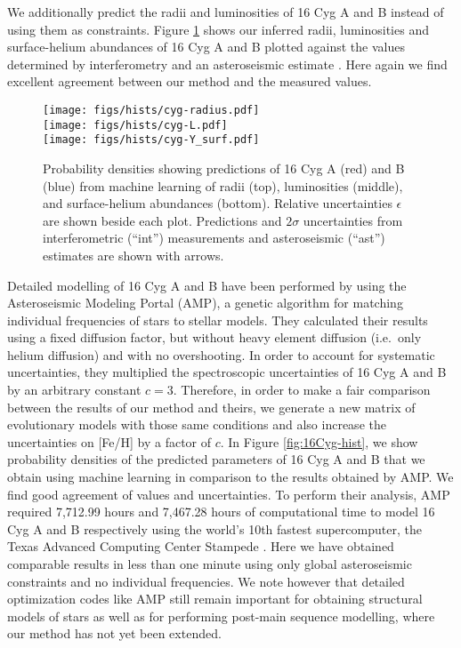 \documentclass[manuscript]{aastex}
\begin{document}
We additionally predict the radii and luminosities of 16 Cyg A and B instead of using them as constraints. Figure \ref{fig:interferometry} shows our inferred radii, luminosities and surface-helium abundances of 16 Cyg A and B plotted against the values determined by interferometry \citep{2013MNRAS.433.1262W} and an asteroseismic estimate \citep{2014ApJ...790..138V}. Here again we find excellent agreement between our method and the measured values. 

\begin{figure}
    \centering
    \texttt{[image: figs/hists/cyg-radius.pdf]}\\
    \texttt{[image: figs/hists/cyg-L.pdf]}\\
    \texttt{[image: figs/hists/cyg-Y\_surf.pdf]}
    \caption{Probability densities showing predictions of 16 Cyg A (red) and B (blue) from machine learning of radii (top), luminosities (middle), and surface-helium abundances (bottom). Relative uncertainties $\epsilon$ are shown beside each plot. Predictions and $2\sigma$ uncertainties from interferometric (``int'') measurements and asteroseismic (``ast'') estimates are shown with arrows.}
    \label{fig:interferometry}
\end{figure}

Detailed modelling of 16 Cyg A and B have been performed  by \citet{2015ApJ...811L..37M} using the Asteroseismic Modeling Portal (AMP), a genetic algorithm for matching individual frequencies of stars to stellar models. They calculated their results using a fixed diffusion factor, but without heavy element diffusion (i.e.~only helium diffusion) and with no overshooting. In order to account for systematic uncertainties, they multiplied the spectroscopic uncertainties of 16 Cyg A and B by an arbitrary constant $c=3$. Therefore, in order to make a fair comparison between the results of our method and theirs, we generate a new matrix of evolutionary models with those same conditions and also increase the uncertainties on [Fe/H] by a factor of $c$. In Figure \ref{fig:16Cyg-hist}, we show probability densities of the predicted parameters of 16 Cyg A and B that we obtain using machine learning in comparison to the results obtained by AMP. We find good agreement of values and uncertainties. To perform their analysis, AMP required 7,712.99 hours and 7,467.28 hours of computational time to model 16 Cyg A and B respectively using the world's 10th fastest supercomputer, the Texas Advanced Computing Center Stampede \citep{TOP500}. Here we have obtained comparable results in less than one minute using only global asteroseismic constraints and no individual frequencies. We note however that detailed optimization codes like AMP still remain important for obtaining structural models of stars as well as for performing post-main sequence modelling, where our method has not yet been extended. 
\end{document}
